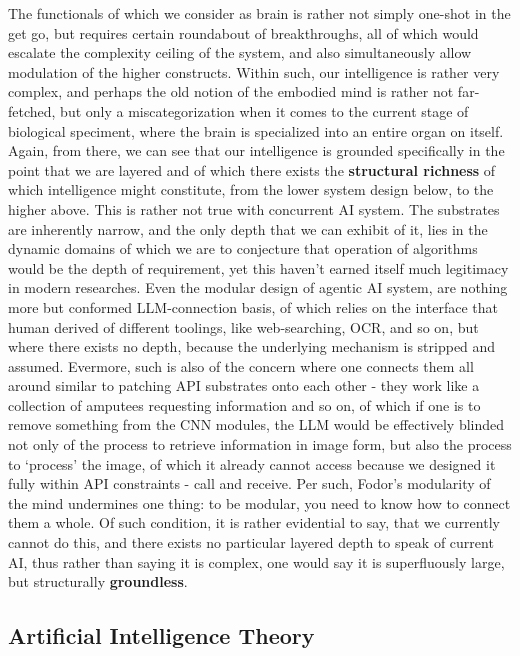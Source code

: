 The functionals of which we consider as brain is rather not simply one-shot in the get go, but requires certain roundabout of breakthroughs, all of which would escalate the complexity ceiling of the system, and also simultaneously allow modulation of the higher constructs. Within such, our intelligence is rather very complex, and perhaps the old notion of the embodied mind is rather not far-fetched, but only a miscategorization when it comes to the current stage of biological speciment, where the brain is specialized into an entire organ on itself. Again, from there, we can see that our intelligence is grounded specifically in the point that we are layered and of which there exists the \textbf{structural richness} of which intelligence might constitute, from the lower system design below, to the higher above. This is rather not true with concurrent AI system. The substrates are inherently narrow, and the only depth that we can exhibit of it, lies in the dynamic domains of which we are to conjecture that operation of algorithms would be the depth of requirement, yet this haven't earned itself much legitimacy in modern researches. Even the modular design of agentic AI system, are nothing more but conformed LLM-connection basis, of which relies on the interface that human derived of different toolings, like web-searching, OCR, and so on, but where there exists no depth, because the underlying mechanism is stripped and assumed. Evermore, such is also of the concern where one connects them all around similar to patching API substrates onto each other - they work like a collection of amputees requesting information and so on, of which if one is to remove something from the CNN modules, the LLM would be effectively blinded not only of the process to retrieve information in image form, but also the process to `process' the image, of which it already cannot access because we designed it fully within API constraints - call and receive. Per such, Fodor's modularity of the mind undermines one thing: to be modular, you need to know how to connect them a whole. Of such condition, it is rather evidential to say, that we currently cannot do this, and there exists no particular layered depth to speak of current AI, thus rather than saying it is complex, one would say it is superfluously large, but structurally \textbf{groundless}. 

\subsection{Artificial Intelligence Theory}

